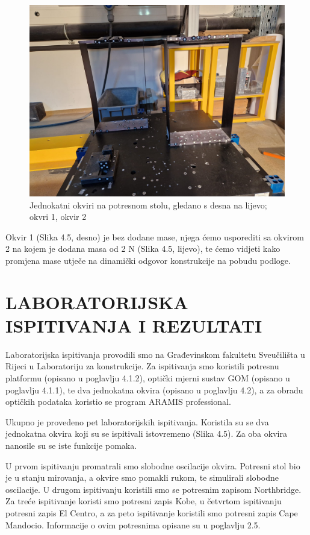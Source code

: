 \documentclass[12pt]{book}
\begin{document}
\begin{figure}[H]
	\centering
	\includegraphics[width=0.7\linewidth]{Slike/okviri}
	\caption{Jednokatni okviri na potresnom stolu, gledano s desna na lijevo; okvri 1, okvir 2}
	\label{fig:okviri}
\end{figure}


Okvir 1 (Slika 4.5, desno) je bez dodane mase, njega ćemo usporediti sa okvirom 2 na kojem je dodana masa od 2 N (Slika 4.5, lijevo), te ćemo vidjeti kako promjena mase utječe na dinamički odgovor konstrukcije na pobudu podloge.

\chapter{\uppercase{Laboratorijska ispitivanja i rezultati}}

Laboratorijska ispitivanja provodili smo na Građevinskom fakultetu Sveučilišta u Rijeci u Laboratoriju za konstrukcije. Za ispitivanja smo koristili potresnu platformu (opisano u poglavlju 4.1.2), optički mjerni sustav GOM (opisano u poglavlju 4.1.1), te dva jednokatna okvira (opisano u poglavlju 4.2), a za obradu optičkih podataka koristio se program ARAMIS professional.

Ukupno je provedeno pet laboratorijskih ispitivanja. Koristila su se dva jednokatna okvira koji su se ispitivali istovremeno (Slika 4.5). Za oba okvira nanosile su se iste funkcije pomaka. 

U prvom ispitivanju promatrali smo slobodne oscilacije okvira. Potresni stol bio je u stanju mirovanja, a okvire smo pomakli rukom, te simulirali slobodne oscilacije. U drugom ispitivanju koristili smo se potresnim zapisom Northbridge. Za treće ispitivanje koristi smo potresni zapis Kobe, u četvrtom ispitivanju potresni zapis El Centro, a za peto ispitivanje koristili smo potresni zapis Cape Mandocio. Informacije o ovim potresnima opisane su u poglavlju 2.5.
\end{document}
